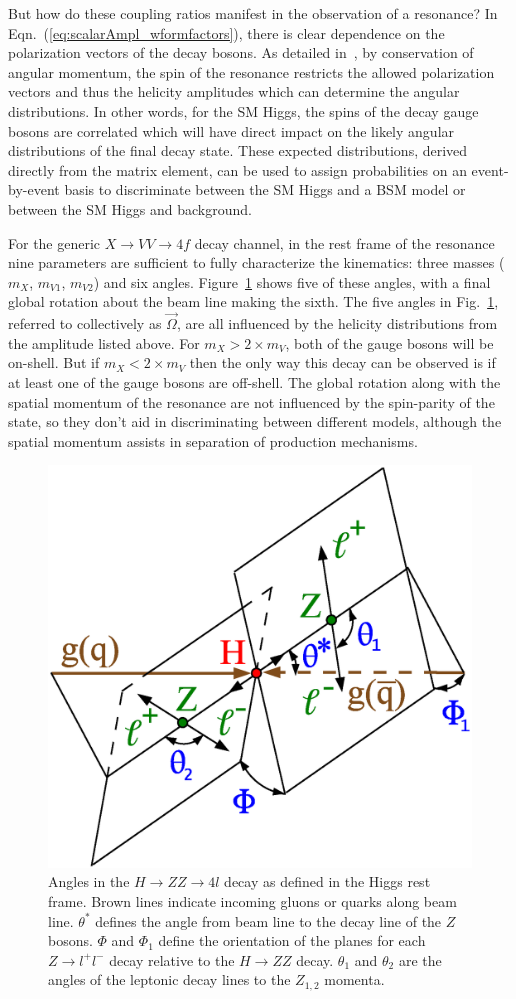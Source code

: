 But how do these coupling ratios manifest in the observation of a resonance? In Eqn.~(\ref{eq:scalarAmpl_wformfactors}), there is clear dependence on the polarization vectors of the decay bosons. As detailed in~\cite{Gao:2010qx}, by conservation of angular momentum, the spin of the resonance restricts the allowed polarization vectors and thus the helicity amplitudes which can determine the angular distributions. In other words, for the SM Higgs, the spins of the decay gauge bosons are correlated which will have direct impact on the likely angular distributions of the final decay state. These expected distributions, derived directly from the matrix element, can be used to assign probabilities on an event-by-event basis to discriminate between the SM Higgs and a BSM model or between the SM Higgs and background.

For the generic $X\rightarrow VV \rightarrow 4f$ decay channel, in the rest frame of the resonance nine parameters are sufficient to fully characterize the kinematics: three masses ($m_X$, $m_{V1}$, $m_{V2}$) and six angles. Figure~\ref{fig:HVVAngles} shows five of these angles, with a final global rotation about the beam line making the sixth. The five angles in Fig.~\ref{fig:HVVAngles}, referred to collectively as $\vec{\Omega}$, are all influenced by the helicity distributions from the amplitude listed above. For $m_X > 2\times m_V$, both of the gauge bosons will be on-shell. But if $m_X < 2\times m_V$ then the only way this decay can be observed is if at least one of the gauge bosons are off-shell. The global rotation along with the spatial momentum of the resonance are not influenced by the spin-parity of the state, so they don't aid in discriminating between different models, although the spatial momentum assists in separation of production mechanisms.

\begin{figure}[htbp]
\begin{center}
\includegraphics[width=.5\linewidth]{Phenomenology/figures/angles-HZZ4l.eps}
\caption[Definition of Angles in $H\rightarrow VV$ Decay]{Angles in the $H\rightarrow ZZ \rightarrow 4l$ decay as defined in the Higgs rest frame. Brown lines indicate incoming gluons or quarks along beam line. $\theta^*$ defines the angle from beam line to the decay line of the $Z$ bosons. $\Phi$ and $\Phi_1$ define the orientation of the planes for each $Z\rightarrow l^+l^-$ decay relative to the $H \rightarrow ZZ$ decay. $\theta_1$ and $\theta_2$ are the angles of the leptonic decay lines to the $Z_{1,2}$ momenta.}
\label{fig:HVVAngles}
\end{center}
\end{figure}

